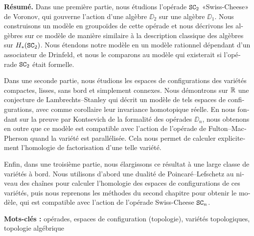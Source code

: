 
\cleardoublepage
{}
{}
\begingroup
\small
\begin{french}
  \textbf{Résumé.}
  Dans une première partie, nous étudions l'opérade $\mathtt{SC}_{2}$ «Swiss-Cheese» de Voronov, qui gouverne l'action d'une algèbre $\DD_{2}$ sur une algèbre $\DD_{1}$.
  Nous construisons un modèle en groupoïdes de cette opérade et nous décrivons les algèbres sur ce modèle de manière similaire à la description classique des algèbres sur $H_{*}(\mathtt{SC}_{2})$.
  Nous étendons notre modèle en un modèle rationnel dépendant d'un associateur de Drinfeld, et nous le comparons au modèle qui existerait si l'opérade $\mathtt{SC}_{2}$ était formelle.

  Dans une seconde partie, nous étudions les espaces de configurations des variétés compactes, lisses, sans bord et simplement connexes.
  Nous démontrons sur $\mathbb{R}$ une conjecture de Lambrechts--Stanley qui décrit un modèle de tels espaces de configurations, avec comme corollaire leur invariance homotopique réelle.
  En nous fondant sur la preuve par Kontsevich de la formalité des opérades $\DD_{n}$, nous obtenons en outre que ce modèle est compatible avec l'action de l'opérade de Fulton--MacPherson quand la variété est parallélisée.
  Cela nous permet de calculer explicitement l'homologie de factorisation d'une telle variété.

  Enfin, dans une troisième partie, nous élargissons ce résultat à une large classe de variétés à bord.
  Nous utilisons d'abord une dualité de Poincaré--Lefschetz au niveau des chaînes pour calculer l'homologie des espaces de configurations de ces variétés, puis nous reprenons les méthodes du second chapitre pour obtenir le modèle, qui est compatible avec l'action de l'opérade Swiss-Cheese $\mathtt{SC}_{n}$.

  \noindent \textbf{Mots-clés : } opérades, espaces de configuration (topologie), variétés topologiques, topologie algébrique
\end{french}
\disfrpt{}
\vfill

